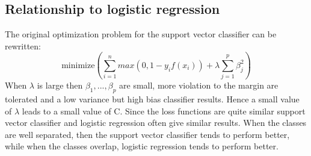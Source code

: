 \documentclass[../document.tex]{subfiles}
\begin{document}
	\subsection{Relationship to logistic regression}
	The original optimization problem for the support vector classifier can be rewritten:
	\begin{equation}
		\text{minimize}(\sum_{i=1}^{n}max(0,1-y_{i}f(x_{i}))+\lambda\sum_{j=1}^{p}\beta_{j}^2)
	\end{equation}
	When $\lambda$ is large then $\beta_{1},...,\beta_{p}$ are small, more violation to the margin are tolerated and a low variance but high bias classifier results. Hence a small value of $\lambda$ leads to a small value of C. Since the loss functions are quite similar support vector classifier and logistic regression often give similar results. When the classes are well separated, then the support vector classifier tends to perform better, while when the classes overlap, logistic regression tends to perform better.
\end{document}
